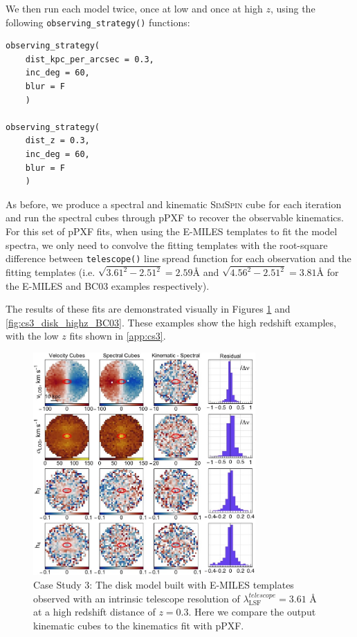 \documentclass[
  journal=pasa,
  manuscript=research-paper, %
  year=2020,
  volume=37,
]{cup-journal}
\newcommand{\simspin}[1]{\textsc{SimSpin}#1} %
\newcommand{\telescope}[1]{\texttt{telescope()}#1}
\newcommand{\observingstrategy}[1]{\texttt{observing\_strategy()}#1}
\begin{document}
\noindent We then run each model twice, once at low and once at high $z$, using the following \observingstrategy{} functions:
\begin{lstlisting}[basicstyle=\fontsize{10}{8}\selectfont\ttfamily]
observing_strategy(
    dist_kpc_per_arcsec = 0.3, 
    inc_deg = 60, 
    blur = F
    )

observing_strategy(
    dist_z = 0.3, 
    inc_deg = 60, 
    blur = F
    )
\end{lstlisting}

As before, we produce a spectral and kinematic \simspin{} cube for each iteration and run the spectral cubes through pPXF to recover the observable kinematics. 
For this set of pPXF fits, when using the E-MILES templates to fit the model spectra, we only need to convolve the fitting templates with the root-square difference between \telescope{} line spread function for each observation and the fitting templates (i.e. $\sqrt{3.61^{2} - 2.51^{2}} = 2.59$\AA{} and $\sqrt{4.56^{2} - 2.51^{2}} = 3.81$\AA{} for the E-MILES and BC03 examples respectively).

The results of these fits are demonstrated visually in Figures \ref{fig:cs3_disk_highz_E-MILES} and \ref{fig:cs3_disk_highz_BC03}. 
These examples show the high redshift examples, with the low $z$ fits shown in \ref{app:cs3}.

\begin{figure}
    \centering
    \includegraphics[keepaspectratio, width=8.5cm]{cs3_disk_velocities_highz_fwhm_EMILES.jpeg}
    \caption{Case Study 3: The disk model built with E-MILES templates observed with an intrinsic telescope resolution of  $\lambda_{\text{LSF}}^{telescope} = 3.61$ \AA{} at a high redshift distance of $z = 0.3$. Here we compare the output kinematic cubes to the kinematics fit with pPXF.}
    \label{fig:cs3_disk_highz_E-MILES}
\end{figure}
\end{document}

